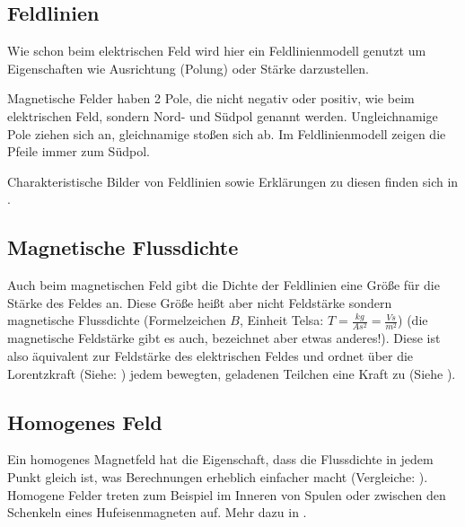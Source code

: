 \subsection{Feldlinien}

Wie schon beim elektrischen Feld wird hier ein Feldlinienmodell genutzt um Eigenschaften wie Ausrichtung (Polung) oder Stärke darzustellen. 

Magnetische Felder haben 2 Pole, die nicht negativ oder positiv, wie beim elektrischen Feld, sondern Nord- und Südpol genannt werden. Ungleichnamige Pole ziehen sich an, gleichnamige stoßen sich ab. Im Feldlinienmodell zeigen die Pfeile immer zum Südpol.

Charakteristische Bilder von Feldlinien sowie Erklärungen zu diesen finden sich in .


\subsection{Magnetische Flussdichte}

Auch beim magnetischen Feld gibt die Dichte der Feldlinien eine Größe für die Stärke des Feldes an. Diese Größe heißt aber nicht Feldstärke sondern \glqq magnetische Flussdichte \grqq{} (Formelzeichen $B$, Einheit \glqq Telsa\grqq : $T=\frac{kg}{As^2}=\frac{Vs}{m^2}$) (die magnetische Feldstärke gibt es auch, bezeichnet aber etwas anderes!). Diese ist also äquivalent zur Feldstärke des elektrischen Feldes und ordnet über die Lorentzkraft (Siehe: ) jedem bewegten, geladenen Teilchen eine Kraft zu (Siehe ).


\subsection{Homogenes Feld} \label{subsec:MFeldHomogen}

Ein homogenes Magnetfeld hat die Eigenschaft, dass die Flussdichte in jedem Punkt gleich ist, was Berechnungen erheblich einfacher macht (Vergleiche: ). Homogene Felder treten zum Beispiel im Inneren von Spulen oder zwischen den Schenkeln eines Hufeisenmagneten auf. Mehr dazu in .


















